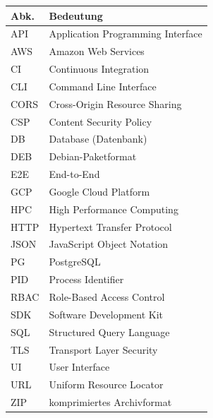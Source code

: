 \documentclass[11pt,a4paper]{article}
\begin{document}
\begin{tabularx}{\textwidth}{@{}lX@{}}
\textbf{Abk.} & \textbf{Bedeutung} \\
\hline

API  & Application Programming Interface \\
AWS  & Amazon Web Services \\
CI   & Continuous Integration \\
CLI  & Command Line Interface \\
CORS & Cross-Origin Resource Sharing \\
CSP  & Content Security Policy \\
DB   & Database (Datenbank) \\
DEB  & Debian-Paketformat \\
E2E  & End-to-End \\
GCP  & Google Cloud Platform \\
HPC  & High Performance Computing \\
HTTP & Hypertext Transfer Protocol \\
JSON & JavaScript Object Notation \\
PG   & PostgreSQL \\
PID  & Process Identifier \\
RBAC & Role-Based Access Control \\
SDK  & Software Development Kit \\
SQL  & Structured Query Language \\
TLS  & Transport Layer Security \\
UI   & User Interface \\
URL  & Uniform Resource Locator \\
ZIP  & komprimiertes Archivformat \\

\end{tabularx}

\clearpage
{}
\setcounter{page}{1}










\end{document}
